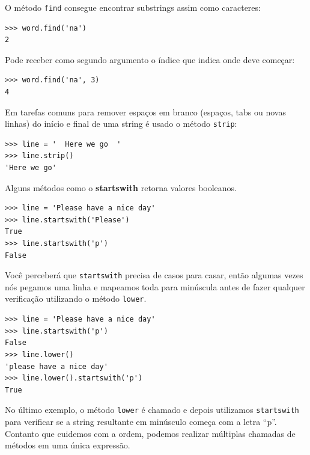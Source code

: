 {O método {\tt find} consegue  encontrar substrings assim como caracteres:

\beforeverb
\begin{verbatim}
>>> word.find('na')
2
\end{verbatim}
\afterverb
%
%
Pode receber como segundo argumento o índice que indica onde deve começar:


\beforeverb
\begin{verbatim}
>>> word.find('na', 3)
4
\end{verbatim}
\afterverb
%
%
Em tarefas comuns para remover espaços em branco (espaços, tabs ou novas
linhas) do início e final de uma string é usado o método {\tt strip}:

\beforeverb
\begin{verbatim}
>>> line = '  Here we go  '
>>> line.strip()
'Here we go'
\end{verbatim}
\afterverb
%
%
Alguns métodos como o {\bf startswith} retorna valores booleanos.

\beforeverb
\begin{verbatim}
>>> line = 'Please have a nice day'
>>> line.startswith('Please')
True
>>> line.startswith('p')
False
\end{verbatim}
\afterverb
%
%
Você perceberá que {\tt startswith} precisa de casos para casar, então algumas
vezes nós pegamos uma linha e mapeamos toda para minúscula antes de fazer
qualquer verificação utilizando o método {\tt lower}.

\beforeverb
\begin{verbatim}
>>> line = 'Please have a nice day'
>>> line.startswith('p')
False
>>> line.lower()
'please have a nice day'
>>> line.lower().startswith('p')
True
\end{verbatim}
\afterverb
%
%
No último exemplo, o método {\tt lower} é chamado e depois utilizamos
{\tt startswith} para verificar se a string resultante em minúsculo começa
com a letra ``p''. Contanto que cuidemos com a ordem, podemos realizar
múltiplas chamadas de métodos em uma única expressão.

}
